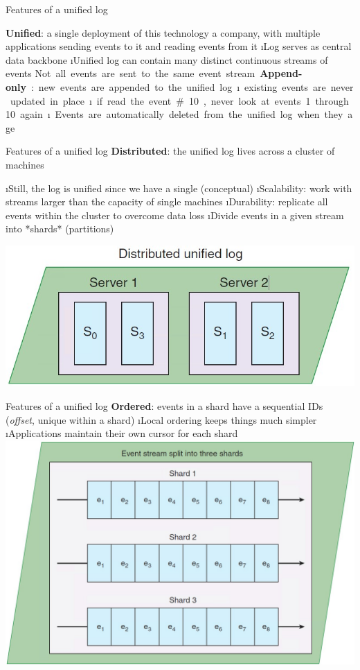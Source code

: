 \begin{frame}{Features of a unified log}

\textbf{Unified}: a single deployment of this technology a company, with multiple applications sending events to it and reading events from it
  \i Log serves as central data backbone
  \i Unified log can contain many distinct continuous streams of events
  \si Not all events are sent to the same event stream

\textbf{Append-only}: new events are appended to the unified log
\i existing events are never updated in place
\i if read the event \#10, never look at events 1 through 10 again
\i Events are automatically deleted from the unified log when they age 
\end{frame}

\begin{frame}{Features of a unified log}
\textbf{Distributed}: the unified log lives across a cluster of machines

\i Still, the log is unified since we have a single (conceptual)
\i Scalability: work with streams larger than the capacity of single machines
\i Durability: replicate all events within the cluster to overcome data loss
\i Divide events in a given stream into *shards* (partitions)

\includegraphics[width=.6\linewidth]{imgs/eventstream_shard.jpg}
\end{frame}

\begin{frame}{Features of a unified log}
\textbf{Ordered}: events in a shard have a sequential IDs (\textit{offset}, unique within a shard)
\i Local ordering keeps things much simpler
\i Applications maintain their own cursor for each shard
\includegraphics[width=.6\linewidth]{imgs/eventstream_order.jpg}
\end{frame}

